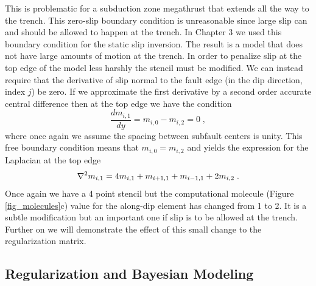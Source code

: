 This is problematic for a subduction zone megathrust that extends all the way to the trench. This zero-slip boundary condition is unreasonable since large slip can and should be allowed to happen at the trench. In Chapter 3 we used this boundary condition for the static slip inversion. The result is a model that does not have large amounts of motion at the trench. In order to penalize slip at the top edge of the model less harshly the stencil must be modified. We can instead require that the derivative of slip normal to the fault edge (in the dip direction, index $j$) be zero. If we approximate the first derivative by a second order accurate central difference then at the top edge we have the condition
\begin{equation}
\frac{dm_{i,1}}{dy}=m_{i,0}-m_{i,2}=0\;,
\end{equation}
where once again we assume the spacing between subfault centers is unity. This free boundary condition means that $m_{i,0}=m_{i,2}$ and yields the expression for the Laplacian at the top edge
\begin{equation}
\nabla^2m_{i,1}=\-4m_{i,1}+m_{i+1,1}+m_{i-1,1}+2m_{i,2}\;.
\end{equation}
Once again we have a 4 point stencil but the computational molecule (Figure \ref{fig_molecules}c) value for the along-dip element has changed from 1 to 2. It is a subtle modification but an important one if slip is to be allowed at the trench. Further on we will demonstrate the effect of this small change to the regularization matrix.


\subsection{Regularization and Bayesian Modeling}

